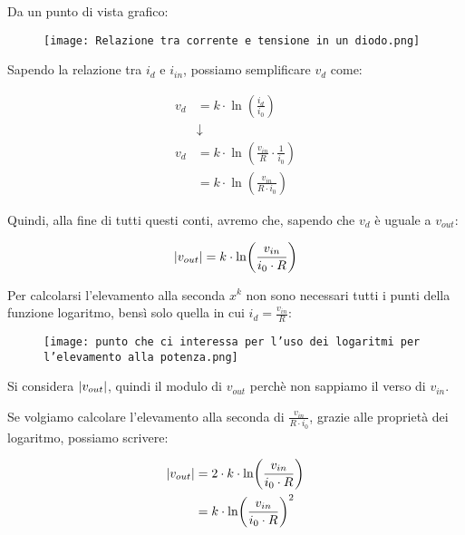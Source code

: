 Da un punto di vista grafico: 

\begin{figure}[h]
    \centering
    \texttt{[image: Relazione tra corrente e tensione in un diodo.png]}
\end{figure}


Sapendo la relazione tra $i_d$ e $i_{in}$, possiamo semplificare $v_d$ come: 

{
    \Large 
    \begin{equation}
        \begin{split}
            v_d &= k \cdot \ln(\frac{i_d}{i_0})
            \\
            &\downarrow 
            \\
            v_d &= k \cdot \ln( \frac{v_{in}}{R} \cdot \frac{1}{i_0})
            \\
            & = k \cdot \ln(\frac{v_{in}}{R \cdot i_0})
        \end{split}
    \end{equation}
}

Quindi, alla fine di tutti questi conti, avremo che, sapendo che $v_d$ è uguale a $v_{out}$: 

{
    \Large 
    \begin{equation}
        \abs{v_{out}}
        = 
        k \cdot \ln(\frac{v_{in}}{i_0 \cdot R})
    \end{equation}
}

Per calcolarsi l'elevamento alla seconda $x^{k}$ non sono necessari tutti i punti della funzione logaritmo, 
bensì solo quella in cui $i_d = \frac{v_{in}}{R}$: 

\begin{figure}[h]
    \centering
    \texttt{[image: punto che ci interessa per l'uso dei logaritmi per l'elevamento alla potenza.png]}
\end{figure}

Si considera $\abs{v_{out}}$, quindi il modulo di $v_{out}$ perchè non sappiamo il verso di $v_{in}$. \newline 

Se volgiamo calcolare l'elevamento alla seconda di $\frac{v_{in}}{R \cdot i_0}$, 
grazie alle proprietà dei logaritmo, possiamo scrivere: 

{
    \Large
    \begin{equation}
        \begin{split}
        \abs{v_{out}}
        &= 
        2 \cdot k \cdot \ln(\frac{v_{in}}{i_0 \cdot R})
        \\
        &= 
        k \cdot \ln(\frac{v_{in}}{i_0 \cdot R})^{2}
        \end{split}
    \end{equation}
}


